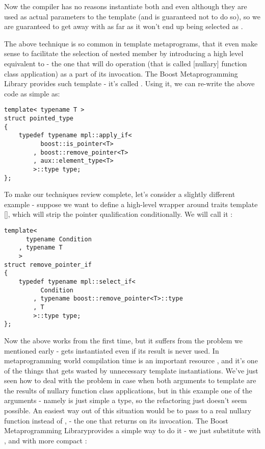 \documentclass{kapproc}
\newcommand{\Mpl}{Boost Meta\-pro\-gram\-ming Library}
\begin{document}
Now the compiler has no reasons instantiate both 
 and 
 even although they are used as 
actual parameters to the  template (and is 
guaranteed not to do so), so we are guaranteed to get away with 
 as far as it won't end up being 
selected as .

The above technique is so common in template metaprograms, that it
even make sense to facilitate the selection of nested  member
by introducing a high level equivalent to  - the one
that will do  operation (that is called [nullary]
function class application) as a part of its invocation.  The \Mpl
provides such template - it's called . Using it, we
can re-write the above code as simple as:

{\small
\begin{codesamp}\begin{verbatim}
template< typename T >
struct pointed_type
{
    typedef typename mpl::apply_if<
          boost::is_pointer<T>
        , boost::remove_pointer<T>
        , aux::element_type<T>
        >::type type;
};
\end{verbatim}
\end{codesamp}
}

To make our techniques review complete, let's consider a slightly 
different example - suppose we want to define a high-level wrapper 
around  traits template [], which will 
strip the pointer qualification conditionally. We will call it 
:

{\small
\begin{codesamp}\begin{verbatim}
template<
      typename Condition
    , typename T
    >
struct remove_pointer_if
{
    typedef typename mpl::select_if<
          Condition
        , typename boost::remove_pointer<T>::type
        , T
        >::type type;
};
\end{verbatim}
\end{codesamp}
}

Now the above works from the first time, but it suffers from the 
problem we mentioned early -  gets 
instantiated even if its result is never used. In metaprogramming 
world compilation time is an important resource \cite{Abr01}, and it's 
one of the things that gets wasted by unnecessary template 
instantiations. We've just seen how to deal with the problem in 
case when both arguments to  template are the 
results of nullary function class applications, but in this example 
one of the arguments - namely  is just simple a type, so 
the refactoring just doesn't seem possible. An easiest way out of 
this situation would be to pass to  a real 
nullary function instead of , - the one that returns 
 on its invocation. The \Mpl provides a simple way to do it -
we just substitute  with ,
and  with more compact 
:
\end{document}
